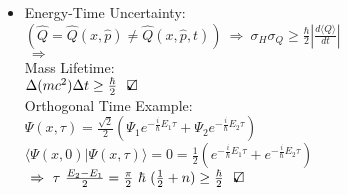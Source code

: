 \documentclass[12pt]{article}
\newcommand{\checkedbox}{\mbox{\ooalign{$\checkmark$\cr\hidewidth$\square$\hidewidth\cr}}} %
\begin{document}
\begin{itemize}
    \item \begin{minipage}[t]{.9\textwidth}
        \setlength{\parindent}{.5cm}
        \noindent Energy-Time Uncertainty:
        \( \left( \widehat{Q} = \widehat{Q}(x,\hat{p}) 
            \neq \widehat{Q}(x,\hat{p},t) \right)
            \ \Rightarrow \ \sigma_H \sigma_Q \geq \frac{\hbar}{2} 
            \left| \frac{d \langle Q \rangle}{dt} \right| \) \\[10pt]
        \indent 
        \( \ \Rightarrow \ \)
        \\[10pt]

        \indent Mass Lifetime: \\[10pt]
        \indent \indent \( \Delta (mc^2) \Delta t \geq \frac{\hbar}{2} \ \ \checkedbox \) \\[5pt]

        \indent Orthogonal Time Example: \\[10pt]
        \indent \indent \( \Psi(x,\tau) = \frac{\sqrt{2}}{2} 
            ( \Psi_1 e^{-\frac{i}{\hbar} E_1 \tau} 
            + \Psi_2 e^{-\frac{i}{\hbar} E_2 \tau} ) \) \\[10pt]
        \indent \indent \( \Big\langle \Psi(x,0) \big| \Psi(x,\tau) \Big\rangle = 0 
            = \frac{1}{2} ( e^{-\frac{i}{\hbar} E_1 \tau} 
            + e^{-\frac{i}{\hbar} E_2 \tau} ) \) \\[10pt]
        \indent \indent \( \ \Rightarrow \ \tau \ \frac{E_2 - E_1}{2} 
            = \frac{\pi}{2} \ \hbar \ (\frac{1}{2} + n) \geq \frac{\hbar}{2} \ \ \checkedbox \)
    \end{minipage}
\end{itemize}
\end{document}
